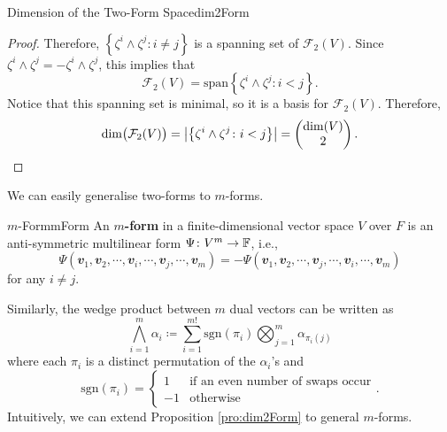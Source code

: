 \documentclass[math, code]{amznotes}
\theoremstyle{remark}
\begin{document}
\begin{probox}{Dimension of the Two-Form Space}{dim2Form}
\begin{proof}
        Therefore, $\left\{\zeta^i \wedge \zeta^j \colon i \neq j\right\}$ is a spanning set of $\mathcal{F}_2(V)$. Since $\zeta^i\wedge\zeta^j = -\zeta^i\wedge\zeta^j$, this implies that 
        \begin{equation*}
            \mathcal{F}_2(V) = \mathrm{span}\left\{\zeta^i \wedge \zeta^j \colon i < j\right\}.
        \end{equation*}
        Notice that this spanning set is minimal, so it is a basis for $\mathcal{F}_2(V)$. Therefore, 
        \begin{equation*}
            \dim\bigl(\mathcal{F}_2(V)\bigr) = {\left\lvert {\left\{\zeta^i \wedge \zeta^j \colon i < j\right\}} \right\rvert} = \begin{pmatrix}
                \dim(V) \\ 
                2
            \end{pmatrix}.
        \end{equation*}
    \end{proof}
\end{probox}
We can easily generalise two-forms to $m$-forms.
\begin{dfnbox}{$m$-Form}{mForm}
    An {\color{red} \textbf{$m$-form}} in a finite-dimensional vector space $V$ over $F$ is an anti-symmetric multilinear form $\Psi \colon V^m \to \mathbb{F}$, i.e.,
    \begin{equation*}
        \Psi\left(\mathbfit{v}_1, \mathbfit{v}_2, \cdots, \mathbfit{v}_i, \cdots, \mathbfit{v}_j, \cdots, \mathbfit{v}_m\right) = -\Psi\left(\mathbfit{v}_1, \mathbfit{v}_2, \cdots, \mathbfit{v}_j, \cdots, \mathbfit{v}_i, \cdots, \mathbfit{v}_m\right)
    \end{equation*}
    for any $i \neq j$.
\end{dfnbox}
Similarly, the wedge product between $m$ dual vectors can be written as 
\begin{equation*}
    \bigwedge_{i = 1}^m\alpha_i \coloneqq \sum_{i = 1}^{m!}\mathrm{sgn}\left(\pi_i\right)\bigotimes_{j = 1}^m\alpha_{\pi_i(j)}
\end{equation*}
where each $\pi_i$ is a distinct permutation of the $\alpha_i$'s and
\begin{equation*}
    \mathrm{sgn}\left(\pi_i\right) = \begin{cases}
        1 & \textrm{if an even number of swaps occur} \\
        -1 & \textrm{otherwise}
    \end{cases}.
\end{equation*}
Intuitively, we can extend Proposition \ref{pro:dim2Form} to general $m$-forms.
\end{document}
